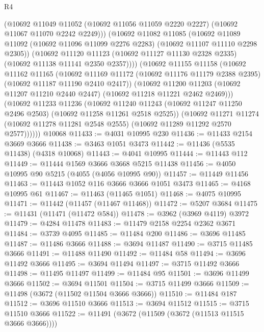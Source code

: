 \begin{lexlean}{R4}
\begin{coremodule}
            (@10692
              @11049
              @11052
              (@10692 @11056 @11059 @2220 @2227)
              (@10692 @11067 @11070 @2242 @2249)))
          (@10692
            @11082
            @11085
            (@10692
              @11089
              @11092
              (@10692 @11096 @11099 @2276 @2283)
              (@10692 @11107 @11110 @2298 @2305))
            (@10692
              @11120
              @11123
              (@10692 @11127 @11130 @2328 @2335)
              (@10692 @11138 @11141 @2350 @2357))))
        (@10692
          @11155
          @11158
          (@10692
            @11162
            @11165
            (@10692
              @11169
              @11172
              (@10692 @11176 @11179 @2388 @2395)
              (@10692 @11187 @11190 @2410 @2417))
            (@10692
              @11200
              @11203
              (@10692 @11207 @11210 @2440 @2447)
              (@10692 @11218 @11221 @2462 @2469)))
          (@10692
            @11233
            @11236
            (@10692
              @11240
              @11243
              (@10692 @11247 @11250 @2496 @2503)
              (@10692 @11258 @11261 @2518 @2525))
            (@10692
              @11271
              @11274
              (@10692 @11278 @11281 @2548 @2555)
              (@10692 @11289 @11292 @2570 @2577))))))
    @10068
@11433 := @4031 @10995 @230
@11436 := @11433 @2154 @3669 @3666
@11438 := @3463 @1051 @3473
@11442 := @11436 (@5535 @11438) (@4318 @10068)
@11443 := @4041 @10995
@11444 := @11443 @112
@11449 := @11444 @1569 @3666 @3668 @5215 @11438
@11456 := @4050 @10995 @90 @5215 (@4055 (@4056 @10995 @90))
@11457 := @11449 @11456
@11463 := @11443 @1052 @116 @3666 @3666 @1051 @3473
@11465 := @4168 @10995 @61
@11467 := @11463 (@11465 @1051)
@11468 := @4075 @10995
@11471 := @11442 (@11457 (@11467 @11468))
@11472 := @5207 @3684
@11475 := @11431 (@11471 (@11472 @584))
@11478 := @3962 (@3969 @4119) @3972
@11479 := @4284 @11478
@11483 := @11479 @2158 @2254 @2362 @3671
@11484 := @3739 @4095
@11485 := @11484 @200
@11486 := @3696 @11485
@11487 := @11486 @3666
@11488 := @3694 @11487
@11490 := @3715 @11485 @3666
@11491 := @11488 @11490
@11492 := @11484 @58
@11494 := @3696 @11492 @3666
@11495 := @3694 @11494
@11497 := @3715 @11492 @3666
@11498 := @11495 @11497
@11499 := @11484 @95
@11501 := @3696 @11499 @3666
@11502 := @3694 @11501
@11504 := @3715 @11499 @3666
@11509 := @11498 (@3672 (@11502 @11504 @3666 @3666))
@11510 := @11484 @187
@11512 := @3696 @11510 @3666
@11513 := @3694 @11512
@11515 := @3715 @11510 @3666
@11522 := @11491 (@3672 (@11509 (@3672 (@11513 @11515 @3666 @3666))))

\end{coremodule}
\end{lexlean}
